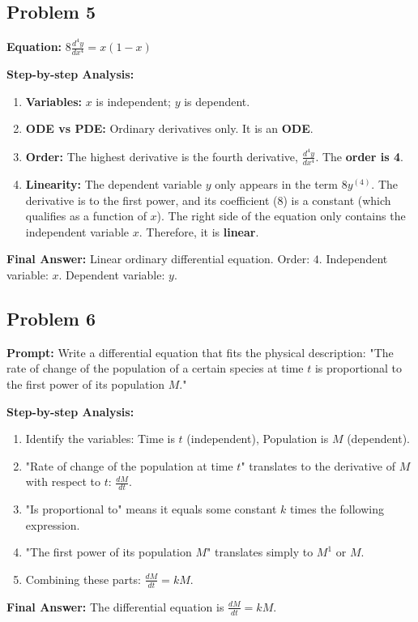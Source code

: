 \documentclass[11pt]{article}
\begin{document}
\subsection*{Problem 5}
\textbf{Equation:} $8\frac{d^4y}{dx^4} = x(1-x)$
\vspace{0.2cm}

\noindent\textbf{Step-by-step Analysis:}
\begin{enumerate}
    \item \textbf{Variables:} $x$ is independent; $y$ is dependent.
    \item \textbf{ODE vs PDE:} Ordinary derivatives only. It is an \textbf{ODE}.
    \item \textbf{Order:} The highest derivative is the fourth derivative, $\frac{d^4y}{dx^4}$. The \textbf{order is 4}.
    \item \textbf{Linearity:} The dependent variable $y$ only appears in the term $8y^{(4)}$. The derivative is to the first power, and its coefficient ($8$) is a constant (which qualifies as a function of $x$). The right side of the equation only contains the independent variable $x$. Therefore, it is \textbf{linear}.
\end{enumerate}
\textbf{Final Answer:} Linear ordinary differential equation. Order: $4$. Independent variable: $x$. Dependent variable: $y$.

\subsection*{Problem 6}
\textbf{Prompt:} Write a differential equation that fits the physical description: "The rate of change of the population of a certain species at time $t$ is proportional to the first power of its population $M$."
\vspace{0.2cm}

\noindent\textbf{Step-by-step Analysis:}
\begin{enumerate}
    \item Identify the variables: Time is $t$ (independent), Population is $M$ (dependent).
    \item "Rate of change of the population at time $t$" translates to the derivative of $M$ with respect to $t$: $\frac{dM}{dt}$.
    \item "Is proportional to" means it equals some constant $k$ times the following expression.
    \item "The first power of its population $M$" translates simply to $M^1$ or $M$.
    \item Combining these parts: $\frac{dM}{dt} = kM$.
\end{enumerate}
\textbf{Final Answer:} The differential equation is $\frac{dM}{dt} = kM$.
\end{document}

